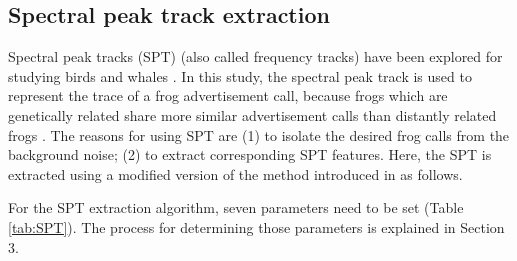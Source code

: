 %
%
%
 


\subsection{Spectral peak track extraction}
Spectral peak tracks (SPT) (also called frequency tracks) have been explored for studying birds \citep{birdTrack, jasaTrack} and whales \citep{roch2011automated}. In this study, the spectral peak track is used to represent the trace of a frog advertisement call, because frogs which are genetically related share more similar advertisement calls than distantly related frogs \citep{Gingras2013}. The reasons for using SPT are (1) to isolate the desired frog calls from the background noise; (2) to extract corresponding SPT features. Here, the SPT is extracted using a modified version of the method introduced in \citep{Xie1504:Acoustic} as follows. 

For the SPT extraction algorithm, seven parameters need to be set (Table \ref{tab:SPT}). The process for determining those parameters is explained in Section 3. 

